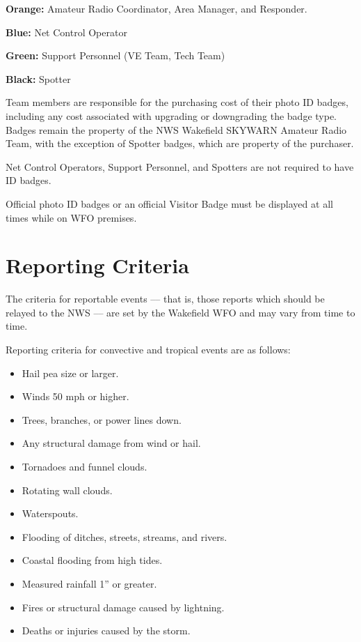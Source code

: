 \documentclass[pdflatex,letterpaper,twoside,12pt]{book}
\begin{document}
\textbf{Orange:}  Amateur Radio Coordinator, Area Manager, and Responder.

\textbf{Blue:}  Net Control Operator

\textbf{Green:}  Support Personnel (VE Team, Tech Team)

\textbf{Black:}  Spotter

Team members are responsible for the purchasing cost of their photo ID badges, including any cost associated with upgrading or downgrading the badge type.  Badges remain the property of the NWS Wakefield SKYWARN Amateur Radio Team, with the exception of Spotter badges, which are property of the purchaser.

Net Control Operators, Support Personnel, and Spotters are not required to have ID badges.

Official photo ID badges or an official Visitor Badge must be displayed at all times while on WFO premises.


\chapter{Reporting Criteria}\label{reporting-criteria}

The criteria for reportable events –-- that is, those reports which should be relayed to the NWS –-- are set by the Wakefield WFO and may vary from time to time.

Reporting criteria for convective and tropical events are as follows:
\begin{itemize}
\item Hail pea size or larger.
\item Winds 50 mph or higher.
\item Trees, branches, or power lines down.
\item Any structural damage from wind or hail.
\item Tornadoes and funnel clouds.
\item Rotating wall clouds.
\item Waterspouts.
\item Flooding of ditches, streets, streams, and rivers.
\item Coastal flooding from high tides.
\item Measured rainfall 1” or greater.
\item Fires or structural damage caused by lightning.
\item Deaths or injuries caused by the storm.
\end{itemize}
\end{document}
